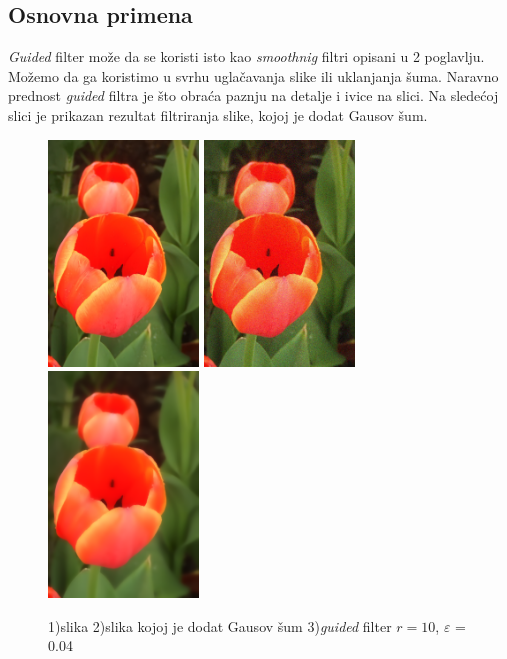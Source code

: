 \documentclass[a4paper,12pt,titlepage]{article}
\begin{document}
\subsection{Osnovna primena}%

\emph{Guided} filter može da se koristi isto kao \emph{smoothnig} filtri opisani u 2 poglavlju. Možemo da ga koristimo u svrhu uglačavanja slike ili uklanjanja šuma. Naravno prednost \emph{guided} filtra je što obraća paznju na detalje i ivice na slici. Na sledećoj slici je prikazan rezultat filtriranja slike, kojoj je dodat Gausov šum.

\begin{figure}[ht!]
\centering
\includegraphics[width=40mm]{img/flower.png}
\includegraphics[width=40mm]{img/flowerNoise.png}
\includegraphics[width=40mm]{img/flowerGF.png}
\caption{1)slika 2)slika kojoj je dodat Gausov šum 3)\emph{guided} filter $r = 10$, $\varepsilon$ = 0.04 }
\label{overflow}
\end{figure}
\end{document}
